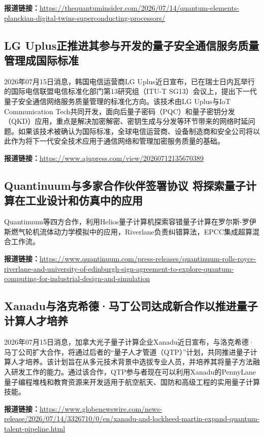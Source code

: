 \documentclass[12pt,a4paper]{ctexart}
\begin{document}
\noindent\textbf{报道链接：}\url{https://thequantuminsider.com/2026/07/14/quantum-elements-planckian-digital-twins-superconducting-processors/}

\subsection{ LG Uplus正推进其参与开发的量子安全通信服务质量管理成国际标准 }

2026年07月15日消息，韩国电信运营商LG Uplus近日宣布，已在瑞士日内瓦举行的国际电信联盟电信标准化部门第13研究组（ITU-T SG13）会议上，提出下一代量子安全通信网络服务质量管理的标准化方向。该技术由LG Uplus与IoT Communication Tech共同开发，面向后量子密码（PQC）和量子密钥分发（QKD）应用，重点是解决加密解密、密钥生成与分发等环节带来的网络时延问题。如果该技术被确认为国际标准，全球电信运营商、设备制造商和安全公司将以此作为将下一代安全技术应用于通信网络和管理加密服务质量的基础。

\noindent\textbf{报道链接：}\url{https://www.ajupress.com/view/20260712135670389}

\subsection{ Quantinuum与多家合作伙伴签署协议 将探索量子计算在工业设计和仿真中的应用 }

Quantinuum等四方合作，利用Helios量子计算机探索容错量子计算在罗尔斯-罗伊斯燃气轮机流体动力学模拟中的应用，Riverlane负责纠错算法，EPCC集成超算混合工作流。

\noindent\textbf{报道链接：}\url{https://www.quantinuum.com/press-releases/quantinuum-rolls-royce-riverlane-and-university-of-edinburgh-sign-agreement-to-explore-quantum-computing-for-industrial-design-and-simulation}

\subsection{ Xanadu与洛克希德·马丁公司达成新合作以推进量子计算人才培养 }

2026年07月15日消息，加拿大光子量子计算企业Xanadu近日宣布，与洛克希德·马丁公司扩大合作，将通过后者的“量子人才管道（QTP）”计划，共同推进量子计算人才培养。该计划旨在从多元技术背景中选拔专业人员，并培养其将量子方法融入研发工作的能力。通过该合作，QTP参与者现在可以利用Xanadu的PennyLane量子编程堆栈和教育资源来开发适用于航空航天、国防和高级工程的实用量子计算技能。

\noindent\textbf{报道链接：}\url{https://www.globenewswire.com/news-release/2026/07/14/3326710/0/en/xanadu-and-lockheed-martin-expand-quantum-talent-pipeline.html}
\end{document}

